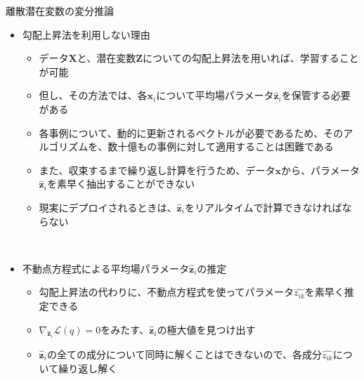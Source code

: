 \documentclass[dvipdfmx,notheorems,t]{beamer}
\begin{document}
\begin{frame}{離散潜在変数の変分推論}
\begin{itemize}
\begin{itemize}
		\item この式には\alert{あまり美的魅力がない}(Somewhat unappealing aesthetically)が、対数尤度よりは計算しやすい
		\item 対数尤度$\ln p(\bm{Z} | \bm{X})$を最大化する代わりに、上記の下界$\mathcal{L}(q)$を$q$について最大化することができる
		\newline
		\item データ$\bm{x}_i$に対するパラメータ$\left\{ \widehat{z_{i1}}, \ldots, \widehat{z_{iK}} \right\}$をまとめて、\color{red}ベクトル$\widehat{\bm{z}}_i$として記述\normalcolor する
		\item パラメータ$\widehat{\bm{z}}_i = \left[ \widehat{z_{i1}}, \ldots, \widehat{z_{iK}} \right]^T$は、データ$\bm{x}_i$に対応する潜在変数$\bm{z}$の各要素が、$1$となる確率を集めたベクトルである
		\newline
		\item $\widehat{z_{ik}} = q(z_{ik} = 1 | \bm{x}_i)$と定義されていることに注意
		\newline
		\item よってベクトル$\widehat{\bm{z}}_i$は、データ$\bm{x}_i$に対応する\alert{二値のスパース符号}である
	\end{itemize} \
	
	\item 勾配上昇法を利用しない理由
	\begin{itemize}
		\item データ$\bm{X}$と、潜在変数$\bm{Z}$についての勾配上昇法を用いれば、学習することが可能
		\item 但し、その方法では、\color{red}各$\bm{x}_i$について\alert{平均場パラメータ}$\widehat{\bm{z}}_i$を保管する必要\normalcolor がある
		\item \alert{各事例について、動的に更新されるベクトルが必要}であるため、そのアルゴリズムを、数十億もの事例に対して適用することは困難である
		\newline
		\item また、\alert{収束するまで繰り返し計算を行う}ため、データ$\bm{x}$から、パラメータ$\widehat{\bm{z}}_i$を素早く抽出することができない
		\item 現実にデプロイされるときは、$\widehat{\bm{z}}_i$をリアルタイムで計算できなければならない
	\end{itemize} \
	
	\item \alert{不動点方程式}による平均場パラメータ$\widehat{\bm{z}}_i$の推定
	\begin{itemize}
		\item 勾配上昇法の代わりに、不動点方程式を使ってパラメータ$\widehat{z_{ik}}$を素早く推定できる
		\newline
		\item $\nabla_{\widehat{\bm{z}}_i} \mathcal{L}(q) = 0$をみたす、$\widehat{\bm{z}}_i$の極大値を見つけ出す
		\item $\widehat{\bm{z}}_i$の全ての成分について同時に解くことはできないので、各成分$\widehat{z_{ik}}$について繰り返し解く
		\newline
		

\end{itemize}
\end{itemize}
\end{frame}
\end{document}
